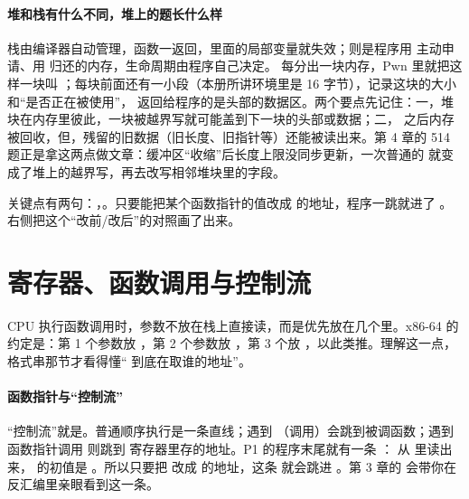 \documentclass[UTF8,12pt,oneside]{ctexbook}
\begin{document}
\paragraph{堆和栈有什么不同，堆上的题长什么样}栈由编译器自动管理，函数一返回，里面的局部变量就失效；则是程序用  主动申请、用  归还的内存，生命周期由程序自己决定。 每分出一块内存，Pwn 里就把这样一块叫 ；每块前面还有一小段（本册所讲环境里是 16 字节），记录这块的大小和“是否正在被使用”， 返回给程序的是头部的数据区。两个要点先记住：一，堆块在内存里彼此，一块被越界写就可能盖到下一块的头部或数据；二， 之后内存被回收，但，残留的旧数据（旧长度、旧指针等）还能被读出来。第 4 章的 514 题正是拿这两点做文章：缓冲区“收缩”后长度上限没同步更新，一次普通的  就变成了堆上的越界写，再去改写相邻堆块里的字段。


关键点有两句：，。只要能把某个函数指针的值改成  的地址，程序一跳就进了 。 右侧把这个“改前/改后”的对照画了出来。


\section{寄存器、函数调用与控制流}
CPU 执行函数调用时，参数不放在栈上直接读，而是优先放在几个里。x86-64 的约定是：第 1 个参数放 ，第 2 个参数放 ，第 3 个放 ，以此类推。理解这一点，格式串那节才看得懂“ 到底在取谁的地址”。

\paragraph{函数指针与“控制流”}“控制流”就是。普通顺序执行是一条直线；遇到 （调用）会跳到被调函数；遇到函数指针调用  则跳到  寄存器里存的地址。P1 的程序末尾就有一条 ： 从  里读出来， 的初值是 。所以只要把  改成  的地址，这条  就会跳进 。第 3 章的  会带你在反汇编里亲眼看到这一条。
\end{document}
